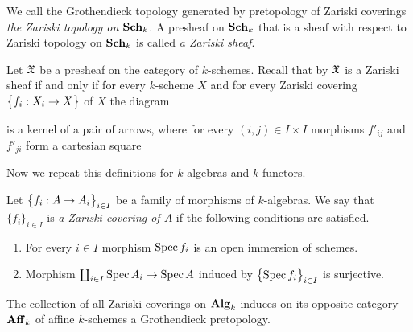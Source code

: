\begin{definition}
We call the Grothendieck topology generated by pretopology of Zariski coverings \textit{the Zariski topology on $\mathbf{Sch}_k$}. A presheaf on $\mathbf{Sch}_k$ that is a sheaf with respect to Zariski topology on $\mathbf{Sch}_k$ is called \textit{a Zariski sheaf}.
\end{definition}
\noindent
Let ${\mathfrak X}$ be a presheaf on the category of $k$-schemes. Recall that by {\cite[Theorem 3.5]{Sheaves}} ${\mathfrak X}$ is a Zariski sheaf if and only if for every $k$-scheme $X$ and for every Zariski covering $\big\{f_i:X_i\rightarrow X\big\}$ of $X$ the diagram
\begin{center}
\end{center}
is a kernel of a pair of arrows, where for every $(i,j)\in I\times I$ morphisms $f'_{ij}$ and $f'_{ji}$ form a cartesian square
\begin{center}
\end{center}
\noindent
Now we repeat this definitions for $k$-algebras and $k$-functors.

\begin{definition}
Let $\big\{f_i:A\rightarrow A_i\big\}_{i\in I}$ be a family of morphisms of $k$-algebras. We say that $\{f_i\}_{i\in I}$ is \textit{a Zariski covering of $A$} if the following conditions are satisfied.
\begin{enumerate}[label=\textbf{(\arabic*)}, leftmargin=1.5em]
\item For every $i\in I$ morphism $\mathrm{Spec}\, f_i$ is an open immersion of schemes.
\item Morphism $\coprod_{i\in I}\mathrm{Spec}\, A_i\rightarrow \mathrm{Spec}\, A$ induced by $\big\{\mathrm{Spec}\, f_i\big\}_{i\in I}$ is surjective.
\end{enumerate}
\end{definition}
\noindent
The collection of all Zariski coverings on $\mathbf{Alg}_k$ induces on its opposite category $\mathbf{Aff}_k$ of affine $k$-schemes a Grothendieck pretopology.

